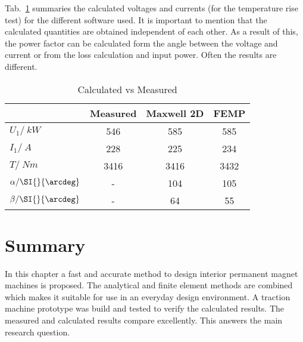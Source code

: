 Tab.~\ref{tab:CalculatedVsMeasured} summaries the calculated voltages and currents (for the temperature rise test) for the different software used. It is important to mention that the calculated quantities are obtained independent of each other. As a result of this, the power factor can be calculated form the angle between the voltage and current or from the loss calculation and input power. Often the results are different.
\begin{table}
	\centering
	\caption{Calculated vs Measured}
	\begin{tabular}{lccc}
		\toprule
		  &  Measured & Maxwell 2D  & FEMP \\\hline
		 $U_1/\SI{}{kW}$   & 546   & 585  & 585  \\
		 $I_1/\SI{}{A}$    & 228   & 225  & 234  \\
		 $T/\SI{}{Nm}$     & 3416  & 3416 & 3432 \\
		 $\alpha/\SI{}{\arcdeg}$ & -     & 104  & 105  \\
		 $\beta/\SI{}{\arcdeg}$  & -     & 64   & 55   \\
		 \bottomrule	
	\end{tabular}
	\label{tab:CalculatedVsMeasured}
\end{table}

\section{Summary}
In this chapter a fast and accurate method to design interior permanent magnet machines is proposed. The analytical and finite element methods are combined which makes it suitable for use in an everyday design environment. A traction machine prototype was build and tested to verify the calculated results. The measured and calculated results compare excellently. This answers the main research question. 

\endinput